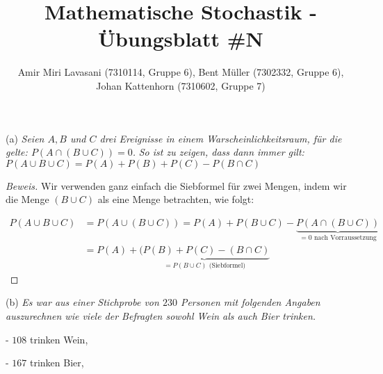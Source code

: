 \documentclass[10pt]{article}
\newenvironment{Aufgabe}[2][Aufgabe]{\begin{trivlist}
\item[\hskip \labelsep {\bfseries #1}\hskip \labelsep {\bfseries #2.}]}{\end{trivlist}}
\begin{document}
 
\title{ \textbf{Mathematische Stochastik - Übungsblatt \#N} }

\author{Amir Miri Lavasani (7310114, Gruppe 6), Bent Müller (7302332, Gruppe 6), \\ 
Johan Kattenhorn (7310602, Gruppe 7)} \maketitle

\begin{Aufgabe}{3}

\end{Aufgabe}

(a) \textit{Seien $A, B$ und $C$ drei Ereignisse in einem Warscheinlichkeitsraum, für die gelte: $P(A \cap (B \cup C)) = 0$.}
\textit{So ist zu zeigen, dass dann immer gilt: $P(A \cup B \cup C) = P(A) + P(B) + P(C) - P(B \cap C)$}
\begin{proof}[Beweis]
Wir verwenden ganz einfach die Siebformel für zwei Mengen, indem wir die Menge $(B \cup C)$ als eine Menge betrachten, wie folgt:

\begin{align*}
P(A \cup B \cup C) &= P(A \cup (B \cup C)) = P(A) + P(B \cup C) - \underbrace{ P(A \cap (B \cup C)) }_{\text{$= 0$ nach Vorraussetzung}} \\
&= P(A) + \underbrace{(P(B) + P(C) - (B \cap C)}_{\text{$= P(B \cup C)$ (Siebformel)}}
\end{align*}

\end{proof}

(b) \textit{Es war aus einer Stichprobe von $230$ Personen mit folgenden Angaben auszurechnen wie viele der Befragten sowohl Wein als auch Bier trinken.}

- $108$ trinken Wein,

- $167$ trinken Bier,
\end{document}
